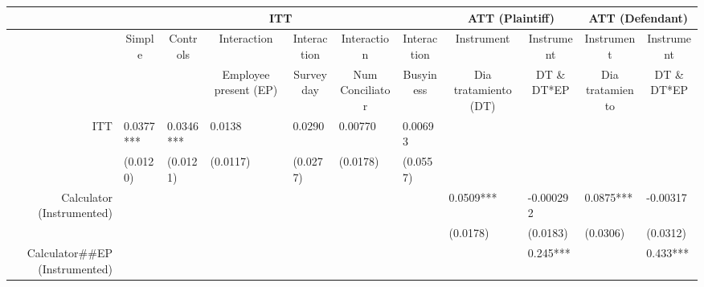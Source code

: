 \begin{tabular}{rrrrrrrrrrr}
\toprule
      & \multicolumn{6}{c}{ITT}                       & \multicolumn{2}{c}{ATT (Plaintiff)} & \multicolumn{2}{c}{ATT (Defendant)} \\
\midrule
      & \multicolumn{1}{c}{Simple} & \multicolumn{1}{c}{Controls} & \multicolumn{1}{c}{Interaction} & \multicolumn{1}{c}{Interaction} & \multicolumn{1}{c}{Interaction} & \multicolumn{1}{c}{Interaction} & \multicolumn{1}{c}{Instrument} & \multicolumn{1}{c}{Instrument} & \multicolumn{1}{c}{Instrument} & \multicolumn{1}{c}{Instrument} \\
      & \multicolumn{1}{c}{} & \multicolumn{1}{c}{} & \multicolumn{1}{c}{Employee present (EP)} & \multicolumn{1}{c}{Survey day} & \multicolumn{1}{c}{Num Conciliator} & \multicolumn{1}{c}{Busyiness} & \multicolumn{1}{c}{Dia tratamiento (DT)} & \multicolumn{1}{c}{DT \& DT*EP} & \multicolumn{1}{c}{Dia tratamiento} & \multicolumn{1}{c}{DT \& DT*EP} \\
ITT   & \multicolumn{1}{l}{0.0377***} & \multicolumn{1}{l}{0.0346***} & \multicolumn{1}{l}{0.0138} & \multicolumn{1}{l}{0.0290} & \multicolumn{1}{l}{0.00770} & \multicolumn{1}{l}{0.00693} & \multicolumn{1}{l}{} & \multicolumn{1}{l}{} & \multicolumn{1}{l}{} & \multicolumn{1}{l}{} \\
      & \multicolumn{1}{l}{(0.0120)} & \multicolumn{1}{l}{(0.0121)} & \multicolumn{1}{l}{(0.0117)} & \multicolumn{1}{l}{(0.0277)} & \multicolumn{1}{l}{(0.0178)} & \multicolumn{1}{l}{(0.0557)} & \multicolumn{1}{l}{} & \multicolumn{1}{l}{} & \multicolumn{1}{l}{} & \multicolumn{1}{l}{} \\
Calculator (Instrumented) & \multicolumn{1}{l}{} & \multicolumn{1}{l}{} & \multicolumn{1}{l}{} & \multicolumn{1}{l}{} & \multicolumn{1}{l}{} & \multicolumn{1}{l}{} & \multicolumn{1}{l}{0.0509***} & \multicolumn{1}{l}{-0.000292} & \multicolumn{1}{l}{0.0875***} & \multicolumn{1}{l}{-0.00317} \\
      & \multicolumn{1}{l}{} & \multicolumn{1}{l}{} & \multicolumn{1}{l}{} & \multicolumn{1}{l}{} & \multicolumn{1}{l}{} & \multicolumn{1}{l}{} & \multicolumn{1}{l}{(0.0178)} & \multicolumn{1}{l}{(0.0183)} & \multicolumn{1}{l}{(0.0306)} & \multicolumn{1}{l}{(0.0312)} \\
Calculator\#\#EP (Instrumented) & \multicolumn{1}{l}{} & \multicolumn{1}{l}{} & \multicolumn{1}{l}{} & \multicolumn{1}{l}{} & \multicolumn{1}{l}{} & \multicolumn{1}{l}{} & \multicolumn{1}{l}{} & \multicolumn{1}{l}{0.245***} & \multicolumn{1}{l}{} & \multicolumn{1}{l}{0.433***} \\

\end{tabular}
